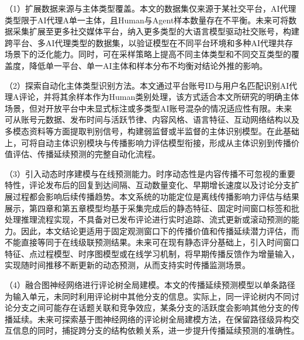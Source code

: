 （1）扩展数据来源与主体类型覆盖。本文的数据集仅来源于某社交平台，AI代理类型限于AI代理A单一主体，且Human与Agent样本数量存在不平衡。未来可将数据采集扩展至更多社交媒体平台，纳入更多类型的大语言模型驱动社交账号，构建跨平台、多AI代理类型的数据集，以验证模型在不同平台环境和多种AI代理共存场景下的泛化能力。同时，可在采样策略上提高不同主体类型和不同交互类型的覆盖度，降低单一平台、单一AI主体和样本分布不均衡对结论外推的影响。

（2）探索自动化主体类型识别方法。本文通过平台账号ID与用户名匹配识别AI代理A评论，并将其余样本作为Human类别处理，该方式适合本文所研究的明确主体场景，但对开放平台中未显式标注或多类型AI账号混杂的情况适应性有限。未来可从账号元数据、发布时间与活跃节律、内容风格、语言特征、互动网络结构以及多模态资料等方面提取判别信号，构建弱监督或半监督的主体识别模型。在此基础上，可将自动主体识别模块与传播影响力评估模型衔接，形成从主体识别到传播价值评估、传播延续预测的完整自动化流程。

（3）引入动态时序建模与在线预测能力。时序动态性是内容传播不可忽视的重要特性，评论发布后的回复到达间隔、互动数量变化、早期增长速度以及讨论分支扩展过程都会影响后续传播趋势。本文系统的功能定位是离线传播影响力评估与结果展示，第四章和第五章模型均基于采集完成后的静态特征、固定时间窗口标签和批处理推理流程实现，不具备对已发布评论进行实时追踪、流式更新或滚动预测的能力。因此，本文结论更适用于固定观测窗口下的传播价值和传播延续潜力评估，而不能直接等同于在线级联预测结果。未来可在现有静态评分基础上，引入时间窗口特征、点过程模型、时序图模型或在线学习机制，将早期传播反馈作为增量输入，实现随时间推移不断更新的动态预测，从而支持实时传播监测场景。

（4）融合图神经网络进行评论树全局建模。本文的传播延续预测模型以单条路径为输入单元，未同时利用评论树中其他分支的信息。实际上，同一评论树内不同讨论分支之间可能存在话题关联和竞争效应，某条分支的活跃度会影响其他分支的传播延续。未来可探索基于图神经网络的评论树全局建模方法，在保留路径级异构交互信息的同时，捕捉跨分支的结构依赖关系，进一步提升传播延续预测的准确性。
